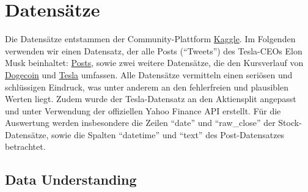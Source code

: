 \documentclass{article}
\begin{document}
\section{Datensätze}
Die Datensätze entstammen der Community-Plattform \href{https://www.kaggle.com/datasets/dhruvildave/dogecoin-historical-data}{Kaggle}.
Im Folgenden verwenden wir einen Datensatz, der alle Posts (``Tweets'') des Tesla-CEOs Elon Musk  beinhaltet: \href{https://www.kaggle.com/datasets/aryansingh0909/elon-musk-tweets-updated-daily}{Posts}, sowie zwei weitere Datensätze, die den Kursverlauf von \href{https://www.kaggle.com/datasets/dhruvildave/dogecoin-historical-datay}{Dogecoin} und \href{https://www.kaggle.com/datasets/dhruvildave/dogecoin-historical-datay}{Tesla} umfassen.
Alle Datensätze vermitteln einen seriösen und schlüssigen Eindruck, was unter anderem an den fehlerfreien und plausiblen Werten liegt.
Zudem wurde der Tesla-Datensatz an den Aktiensplit angepasst und unter Verwendung der offiziellen Yahoo Finance API erstellt.
Für die Auswertung werden insbesondere die Zeilen ``date'' und ``raw\_close'' der Stock-Datensätze, sowie die Spalten ``datetime'' und ``text'' des Post-Datensatzes betrachtet.


\subsection{Data Understanding}
\end{document}
